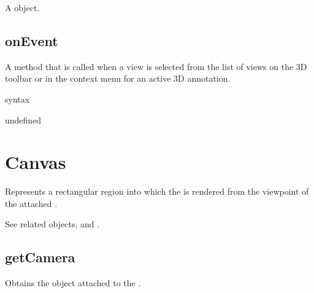 \documentclass[letterpaper,12pt,english,openany,oneside]{sphinxmanual}
\begin{document}
\begin{sphinxVerbatim}[commandchars=\\\{\}]
 
\end{sphinxVerbatim}
\label{\detokenize{JS_3D_API:returns-6}}

A  object.


\subsection{onEvent}
\label{\detokenize{JS_3D_API:onevent}}
A method that is called when a view is selected from the list of views on the 3D toolbar or in the context menu for an active 3D annotation.

\label{\detokenize{JS_3D_API:syntax-7}}
syntax

\begin{sphinxVerbatim}[commandchars=\\\{\}]
\end{sphinxVerbatim}
\label{\detokenize{JS_3D_API:parameters-4}}

\label{\detokenize{JS_3D_API:section-10}}\label{\detokenize{JS_3D_API:returns-7}}

undefined


\section{Canvas}
\label{\detokenize{JS_3D_API:canvas}}
Represents a rectangular region into which the  is rendered from the viewpoint of the attached .

See related objects,  and .

\label{\detokenize{JS_3D_API:properties-5}}


\subsection{getCamera}
\label{\detokenize{JS_3D_API:getcamera}}
Obtains the  object attached to the .
\end{document}
